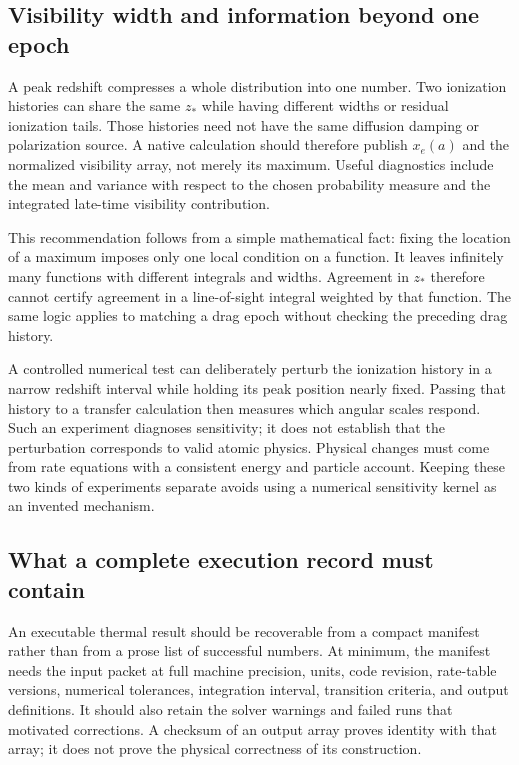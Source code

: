 \subsection{Visibility width and information beyond one epoch}

A peak redshift compresses a whole distribution into one number. Two ionization histories can share the same $z_*$ while having different widths or residual ionization tails. Those histories need not have the same diffusion damping or polarization source. A native calculation should therefore publish $x_e(a)$ and the normalized visibility array, not merely its maximum. Useful diagnostics include the mean and variance with respect to the chosen probability measure and the integrated late-time visibility contribution.

This recommendation follows from a simple mathematical fact: fixing the location of a maximum imposes only one local condition on a function. It leaves infinitely many functions with different integrals and widths. Agreement in $z_*$ therefore cannot certify agreement in a line-of-sight integral weighted by that function. The same logic applies to matching a drag epoch without checking the preceding drag history.

A controlled numerical test can deliberately perturb the ionization history in a narrow redshift interval while holding its peak position nearly fixed. Passing that history to a transfer calculation then measures which angular scales respond. Such an experiment diagnoses sensitivity; it does not establish that the perturbation corresponds to valid atomic physics. Physical changes must come from rate equations with a consistent energy and particle account. Keeping these two kinds of experiments separate avoids using a numerical sensitivity kernel as an invented mechanism.

\subsection{What a complete execution record must contain}

An executable thermal result should be recoverable from a compact manifest rather than from a prose list of successful numbers. At minimum, the manifest needs the input packet at full machine precision, units, code revision, rate-table versions, numerical tolerances, integration interval, transition criteria, and output definitions. It should also retain the solver warnings and failed runs that motivated corrections. A checksum of an output array proves identity with that array; it does not prove the physical correctness of its construction.


